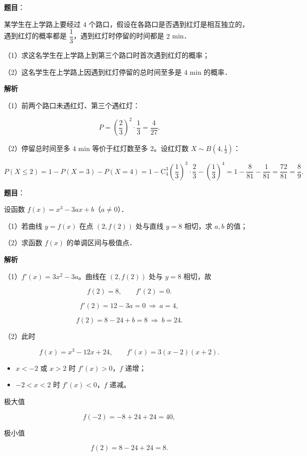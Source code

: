 \begin{answer}

\textbf{题目}：

某学生在上学路上要经过 $4$ 个路口，假设在各路口是否遇到红灯是相互独立的，遇到红灯的概率都是 $\dfrac13$，遇到红灯时停留的时间都是 $2$ min．

（1）求这名学生在上学路上到第三个路口时首次遇到红灯的概率；

（2）这名学生在上学路上因遇到红灯停留的总时间至多是 $4$ min 的概率．

\textbf{解析}

（1）前两个路口未遇红灯、第三个遇红灯：

\nopagebreak[4]
\[P=\left(\frac23\right)^2\cdot\frac13=\frac4{27}.\]

（2）停留总时间至多 $4$ min 等价于红灯数至多 $2$。设红灯数 $X\sim B\left(4,\frac13\right)$：

\nopagebreak[4]
\[P(X\leqslant2)=1-P(X=3)-P(X=4)
=1-\mathrm C_4^3\left(\frac13\right)^3\cdot\frac23-\left(\frac13\right)^4
=1-\frac8{81}-\frac1{81}=\frac{72}{81}=\frac89 .\]


\end{answer}
\begin{answer}

\textbf{题目}：

设函数 $f(x)=x^3-3ax+b$（$a\neq0$）．

（1）若曲线 $y=f(x)$ 在点 $(2,f(2))$ 处与直线 $y=8$ 相切，求 $a,b$ 的值；

（2）求函数 $f(x)$ 的单调区间与极值点．

\textbf{解析}

（1）$f'(x)=3x^2-3a$。曲线在 $(2,f(2))$ 处与 $y=8$ 相切，故

\nopagebreak[4]
\[f(2)=8,\qquad f'(2)=0 .\]

\nopagebreak[4]
\[f'(2)=12-3a=0\ \Longrightarrow\ a=4,\]

\nopagebreak[4]
\[f(2)=8-24+b=8\ \Longrightarrow\ b=24 .\]

（2）此时

\nopagebreak[4]
\[f(x)=x^3-12x+24,\qquad f'(x)=3(x-2)(x+2).\]

\begin{itemize}
\item $x<-2$ 或 $x>2$ 时 $f'(x)>0$，$f$ 递增；
\item $-2<x<2$ 时 $f'(x)<0$，$f$ 递减。
\end{itemize}

极大值

\nopagebreak[4]
\[f(-2)=-8+24+24=40,\]

极小值

\nopagebreak[4]
\[f(2)=8-24+24=8 .\]


\end{answer}
